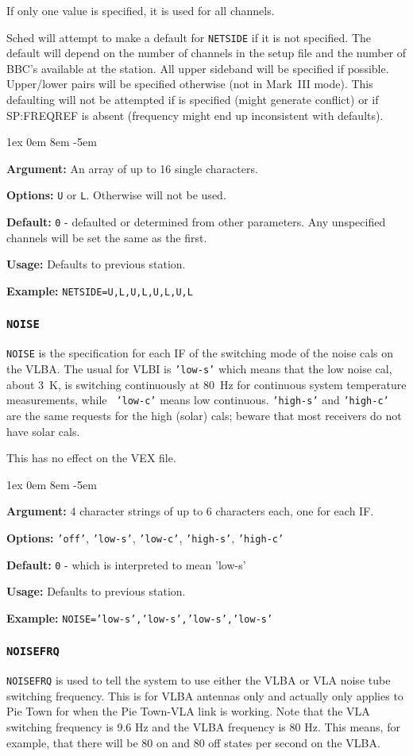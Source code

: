 \documentclass{report}
\newcommand{\rcwbox}[5]{
  \begin{list}{}{\parsep 1ex  \itemsep 0em
                 \leftmargin 8em  \itemindent -5em }
    \item {\bf Argument:} #1
    \item {\bf Options:}  #2
    \item {\bf Default:}  #3
    \item {\bf Usage:}    #4
    \item {\bf Example:}  #5
  \end{list}
}
\begin{document}
If only one value is specified, it is used for all channels.

Sched will attempt to make a default for {\tt NETSIDE} if it is
not specified.  The default will depend on the number of channels
in the setup file and the number of BBC's available at the station.
All upper sideband will be specified if possible.  Upper/lower pairs
will be specified otherwise (not in Mark~III mode).  This defaulting
will not be attempted if  is
specified (might generate conflict) or if 
{SP:FREQREF} is absent (frequency might end up inconsistent with
defaults).

\rcwbox
{An array of up to 16 single characters.}
{{\tt U} or {\tt L}. Otherwise will not be used.}
{{\tt 0} - defaulted or determined from other parameters.  Any
unspecified channels will be set the same as the first.}
{Defaults to previous station.}
{{\tt NETSIDE=U,L,U,L,U,L,U,L}}



\subsubsection{\label{SP:NOISE}{\tt NOISE}}

{\tt NOISE} is the specification for each IF of the switching mode of
the noise cals on the VLBA. The usual for VLBI is {\tt 'low-s'} which
means that the low noise cal, about 3~K, is switching continuously at
80~Hz for continuous system temperature measurements, while {\tt
'low-c'} means low continuous. {\tt 'high-s'} and {\tt 'high-c'} are
the same requests for the high (solar) cals; beware that most
receivers do not have solar cals.

This has no effect on the VEX file.

\rcwbox
{4 character strings of up to 6 characters each, one for each IF.}
{{\tt 'off'}, {\tt 'low-s'}, {\tt 'low-c'}, {\tt 'high-s'},
{\tt 'high-c'}}
{{\tt 0} - which is interpreted to mean 'low-s'}
{Defaults to previous station.}
{{\tt NOISE='low-s','low-s','low-s','low-s'}}

\subsubsection{\label{SP:NOISEFRQ}{\tt NOISEFRQ}}

{\tt NOISEFRQ} is used to tell the system to use either the VLBA or
VLA noise tube switching frequency.  This is for VLBA antennas only
and actually only applies to Pie Town for when the Pie Town-VLA link
is working.  Note that the VLA switching frequency is 9.6 Hz and the
VLBA frequency is 80 Hz.  This means, for example, that there will be
80 on and 80 off states per second on the VLBA.
\end{document}
